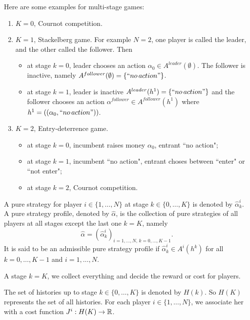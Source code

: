 Here are some examples for multi-stage games:
\begin{enumerate}
	\item $K=0$, Cournot competition.
	\item $K=1$, Stackelberg game. For example $N=2$, one player is called the leader, and the other called the follower. Then
		\begin{itemize}
			\item at stage $k=0$, leader chooses an action $\alpha_0 \in A^{leader}(\emptyset)$. The follower is inactive, namely $A^{follower}(\emptyset)=\{``no \, action" \}$. 
			\item at stage $k=1$, leader is inactive $A^{leader}(h^1)=\{``no \, action" \}$ and the follower chooses an action $\alpha^{follower} \in A^{follower}(h^1)$ where $h^1 = ( (\alpha_0, ``no \, action") )$. 
		\end{itemize}
	\item $K=2$, Entry-deterrence game.
			\begin{itemize}
				\item at stage $k=0$, incumbent raises money $\alpha_0$, entrant ``no action";
				\item at stage $k=1$, incumbent ``no action", entrant choses between ``enter" or ``not enter";
				\item at stage $k=2$, Cournot competition.
			\end{itemize}
\end{enumerate}


\begin{definition}
	A pure strategy for player $i\in \{1,\ldots,N\}$ at stage $k\in \{0,\ldots, K\}$ is denoted by $\hat{\alpha}^i_k$.\\
	A pure strategy profile, denoted by $\hat{\alpha}$, is the collection of pure strategies of all players at all stages except the last one $k=K$, namely
	$$
		\hat{\alpha} = (\hat{\alpha}^i_k)_{i=1,\ldots,N,\, k=0,\ldots,K-1}.
	$$
	It is said to be an admissible pure strategy profile if $\hat{\alpha}_k^i \in A^i(h^k)$ for all $k=0,\ldots, K-1$ and $i=1,\ldots,N$.
\end{definition}

\begin{remark}
	A stage $k=K$, we collect everything and decide the reward or cost for players.
\end{remark}


\begin{definition}
	The set of histories up to stage $k\in \{0,\ldots, K\}$ is denoted by $H(k)$. So $H(K)$ represents the set of all histories. For each player $i \in \{1,\ldots,N\}$, we associate her with a cost function $J^i: H(K) \to \mathbb{R}$.
\end{definition} 

